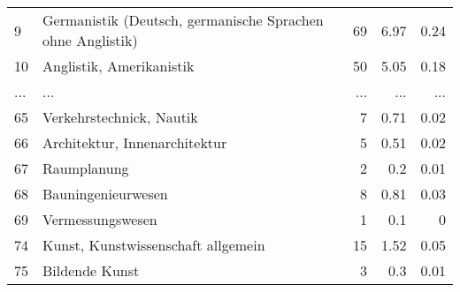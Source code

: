 \begin{longtable}{lXrrr}
        9 & \multicolumn{1}{X}{Germanistik (Deutsch, germanische Sprachen ohne Anglistik)} & %
          \num{69} &
          \num[round-mode=places,round-precision=2]{6,97} &
          \num[round-mode=places,round-precision=2]{0,24} \\
        10 & \multicolumn{1}{X}{Anglistik, Amerikanistik} & %
          \num{50} &
          \num[round-mode=places,round-precision=2]{5,05} &
          \num[round-mode=places,round-precision=2]{0,18} \\
       ... & ... & ... & ... & ... \\
        65 & \multicolumn{1}{X}{Verkehrstechnick, Nautik} & %
          \num{7} &
          \num[round-mode=places,round-precision=2]{0,71} &
          \num[round-mode=places,round-precision=2]{0,02} \\

        66 & \multicolumn{1}{X}{Architektur, Innenarchitektur} & %
          \num{5} &
          \num[round-mode=places,round-precision=2]{0,51} &
          \num[round-mode=places,round-precision=2]{0,02} \\

        67 & \multicolumn{1}{X}{Raumplanung} & %
          \num{2} &
          \num[round-mode=places,round-precision=2]{0,2} &
          \num[round-mode=places,round-precision=2]{0,01} \\

        68 & \multicolumn{1}{X}{Bauningenieurwesen} & %
          \num{8} &
          \num[round-mode=places,round-precision=2]{0,81} &
          \num[round-mode=places,round-precision=2]{0,03} \\

        69 & \multicolumn{1}{X}{Vermessungswesen} & %
          \num{1} &
          \num[round-mode=places,round-precision=2]{0,1} &
          \num[round-mode=places,round-precision=2]{0} \\

        74 & \multicolumn{1}{X}{Kunst, Kunstwissenschaft allgemein} & %
          \num{15} &
          \num[round-mode=places,round-precision=2]{1,52} &
          \num[round-mode=places,round-precision=2]{0,05} \\

        75 & \multicolumn{1}{X}{Bildende Kunst} & %
          \num{3} &
          \num[round-mode=places,round-precision=2]{0,3} &
          \num[round-mode=places,round-precision=2]{0,01} \\


\end{longtable}
